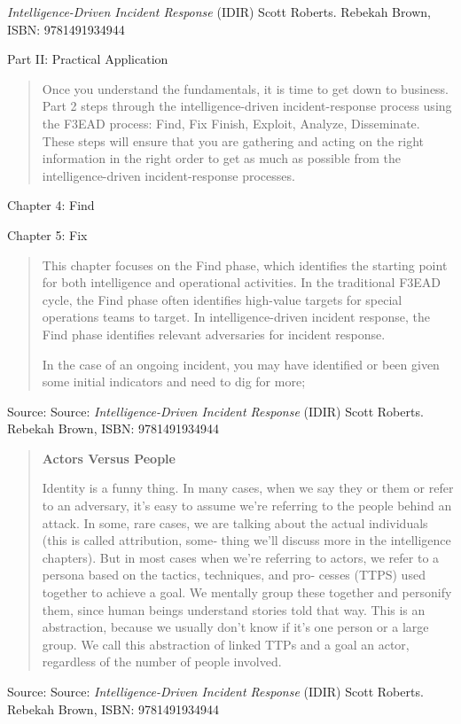 \documentclass[Screen16to9,17pt]{foils}
\begin{document}

\emph{Intelligence-Driven Incident Response} (IDIR)
 Scott Roberts. Rebekah Brown, ISBN: 9781491934944

Part II: Practical Application

\begin{quote}
Once you understand the fundamentals, it is time to get down to business. Part 2
steps through the intelligence-driven incident-response process using the F3EAD
process: Find, Fix Finish, Exploit, Analyze, Disseminate. These steps will ensure that
you are gathering and acting on the right information in the right order to get as
much as possible from the intelligence-driven incident-response processes.
\end{quote}

\begin{list2}
\item Chapter 4: Find
\item Chapter 5: Fix
\end{list2}




\begin{quote}
This chapter focuses on the Find phase, which identifies the starting point for both
intelligence and operational activities. In the traditional F3EAD cycle, the Find phase
often identifies high-value targets for special operations teams to target. In
intelligence-driven incident response, the Find phase identifies relevant adversaries
for incident response.

In the case of an ongoing incident, you may have identified or been given some initial
indicators and need to dig for more;
\end{quote}
Source: Source: \emph{Intelligence-Driven Incident Response} (IDIR)
 Scott Roberts. Rebekah Brown, ISBN: 9781491934944




\begin{quote}
\centerline{\bf\Large Actors Versus People}

Identity is a funny thing. In many cases, when we say they or them or refer to an
adversary, it’s easy to assume we’re referring to the people behind an attack. In some,
rare cases, we are talking about the actual individuals (this is called attribution, some‐
thing we’ll discuss more in the intelligence chapters). But in most cases when we’re
referring to actors, we refer to a persona based on the tactics, techniques, and pro‐
cesses (TTPS) used together to achieve a goal. We mentally group these together and
personify them, since human beings understand stories told that way. This is an
abstraction, because we usually don’t know if it’s one person or a large group. We call
this abstraction of linked TTPs and a goal an actor, regardless of the number of people involved.
\end{quote}
Source: Source: \emph{Intelligence-Driven Incident Response} (IDIR)
 Scott Roberts. Rebekah Brown, ISBN: 9781491934944
\end{document}

